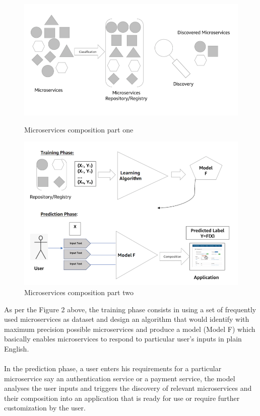 \documentclass{article}
\begin{document}
\begin{figure}[h!]
\includegraphics{discovery.png}
\caption{Microservices composition part one}
\includegraphics{mcsvcomposition.png}
\caption{Microservices composition part two}
\end{figure}

\pagebreak

\noindent As per the Figure 2 above, the training phase consists in using a set of frequently used microservices as dataset and design an algorithm that would identify with maximum precision possible microservices and produce a model (Model F) which basically enables microservices to respond to particular user’s inputs in plain English. 
\\
\\
\noindent In the prediction phase, a user enters his requirements for a particular microservice say an authentication service or a payment service, the model analyses the user inputs and triggers the discovery of relevant microservices and their composition into an application that is ready for use or require further customization by the user.
\end{document}

